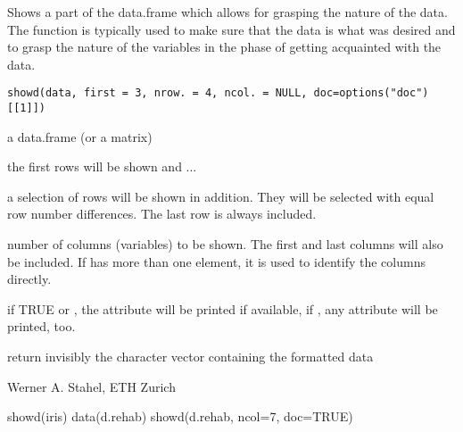 \documentclass{article}
\begin{document}
\begin{Description}\relax
Shows a part of the data.frame which allows for grasping the nature of
the data. The function is typically used to make sure that the data is
what was desired and to grasp the nature of the variables in the phase
of getting acquainted with the data.
\end{Description}
\begin{Usage}
\begin{verbatim}
showd(data, first = 3, nrow. = 4, ncol. = NULL, doc=options("doc")[[1]])
\end{verbatim}
\end{Usage}
\begin{Arguments}
\begin{ldescription}
\item[\code{data}] a data.frame (or a matrix)
\item[\code{first}] the first  rows will be shown and ...
\item[\code{nrow.}] a selection of  rows will be shown in
addition. They will be selected with equal row number differences.
The last row is always included.
\item[\code{ncol.}] number of columns (variables) to be shown. The first and
last columns will also be included. If  has more than
one element, it is used to identify the columns directly.
\item[\code{doc}] if TRUE or , the  attribute will be
printed if available, if , any  attribute will
be printed, too.
\end{ldescription}
\end{Arguments}
\begin{Value}
return invisibly the character vector containing the formatted data
\end{Value}
\begin{Author}\relax
Werner A. Stahel, ETH Zurich
\end{Author}
\begin{Examples}
\begin{ExampleCode}
showd(iris)
data(d.rehab)
showd(d.rehab, ncol=7, doc=TRUE)
\end{ExampleCode}
\end{Examples}
\end{document}
